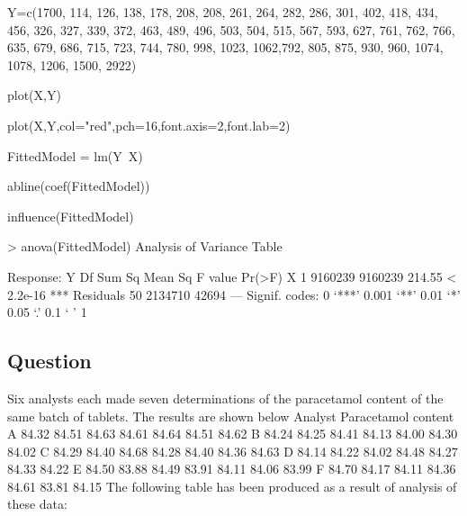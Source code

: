\documentclass[a4paper,12pt]{article}
\begin{document}
Y=c(1700, 114, 126, 138, 178, 208, 208, 261, 264, 282, 286, 301, 
402, 418, 434, 456, 326, 327, 339, 372,  463, 489, 496, 503, 504, 
515, 567, 593, 627, 761, 762, 766,  635, 679, 686, 715, 723, 744, 
780, 998, 1023, 1062,792, 805, 875, 930, 960,  1074, 1078, 1206, 
1500, 2922)

plot(X,Y)

plot(X,Y,col="red",pch=16,font.axis=2,font.lab=2)

FittedModel = lm(Y~X)

abline(coef(FittedModel))

influence(FittedModel)


> anova(FittedModel)
Analysis of Variance Table

Response: Y
          	Df  	Sum Sq 	Mean Sq 	F value    	Pr(>F)    
X         	 1 	9160239 	9160239 	 214.55 	< 2.2e-16 ***
Residuals 	50 	2134710   	42694                      
---
Signif. codes:  0 ‘***’ 0.001 ‘**’ 0.01 ‘*’ 0.05 ‘.’ 0.1 ‘ ’ 1 


\subsection{Question}
Six analysts each made seven determinations of the paracetamol content of the same batch of tablets.
The results are shown below
Analyst Paracetamol content
A 84.32 84.51 84.63 84.61 84.64 84.51 84.62
B 84.24 84.25 84.41 84.13 84.00 84.30 84.02
C 84.29 84.40 84.68 84.28 84.40 84.36 84.63
D 84.14 84.22 84.02 84.48 84.27 84.33 84.22
E 84.50 83.88 84.49 83.91 84.11 84.06 83.99
F 84.70 84.17 84.11 84.36 84.61 83.81 84.15
The following table has been produced as a result of analysis of these data:
\end{document}
